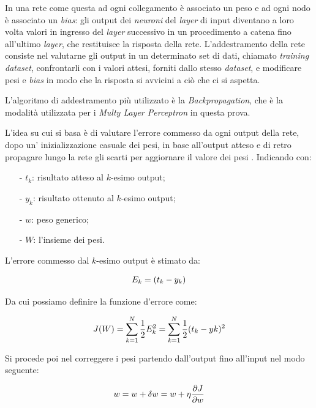\documentclass[12pt,a4paper]{report}
\begin{document}
In una rete come questa ad ogni collegamento è associato un peso e ad ogni nodo è associato un \textit{bias}: gli output dei \textit{neuroni} del \textit{layer} di input diventano a loro volta valori in ingresso del \textit{layer} successivo in un procedimento a catena fino all'ultimo \textit{layer}, che restituisce la risposta della rete. 
L'addestramento della rete consiste nel valutarne gli output in un determinato set di dati, chiamato \textit{training dataset}, confrontarli con i valori attesi, forniti dallo stesso \textit{dataset}, e modificare pesi e \textit{bias} in modo che la risposta si avvicini a ciò che ci si aspetta.

L'algoritmo di addestramento più utilizzato è la \textit{Backpropagation}, che è la modalità utilizzata per i \textit{Multy Layer Perceptron} in questa prova.

L'idea su cui si basa è di valutare l'errore commesso da ogni output della rete, dopo un' inizializzazione casuale dei pesi, in base all'output atteso e di retro propagare lungo la rete gli scarti per aggiornare il valore dei pesi \cite{backprop}.
Indicando con:

\begin{enumerate}
 \item[-] $t_{k}$: risultato atteso al $k$-esimo output;
 \item[-] $y_{k}$: risultato ottenuto al $k$-esimo output;
 \item[-] $w$: peso generico;
 \item[-] $W$: l'insieme dei pesi.
\end{enumerate}

L'errore commesso dal $k$-esimo output è stimato da:

\begin{equation}
 \centering
 E_{k} = (t_{k}-y_{k})
\end{equation}

Da cui possiamo definire la funzione d'errore come:

\begin{equation}
 \centering
 J(W) = \sum_{k = 1}^{N}\frac{1}{2}E_{k}^2 = \sum_{k = 1}^{N}\frac{1}{2}(t_{k}-y{k})^2
\end{equation}

Si procede poi nel correggere i pesi partendo dall'output fino all'input nel modo seguente:

\begin{equation}
 \centering
 w = w + \delta w = w + \eta \frac{\partial J}{\partial w}
\end{equation}
\end{document}
